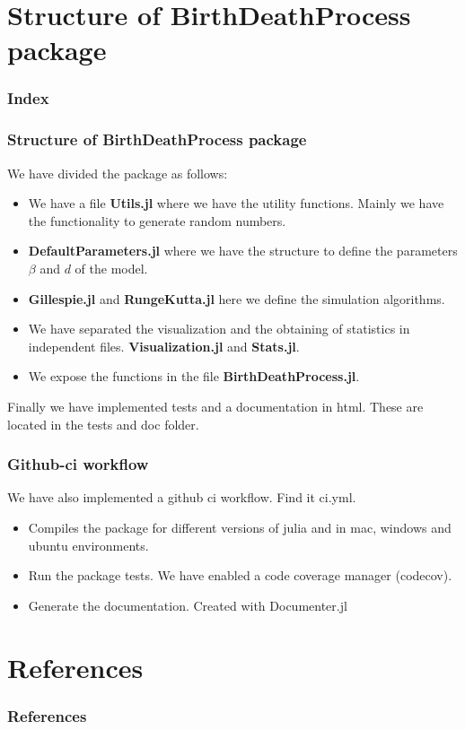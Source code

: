 \documentclass[10pt, usenames, dvipsnames, xcolor=table]{beamer}
\begin{document}
\section{Structure of BirthDeathProcess package}
\begin{frame}
  \frametitle{Index}
  \tableofcontents[currentsection]
\end{frame}
\begin{frame}
\frametitle{Structure of BirthDeathProcess package}
We have divided the package as follows:
\begin{itemize}
\item We have a file \textbf{Utils.jl} where we have the utility functions. Mainly we have the functionality to generate random numbers.
\item \textbf{DefaultParameters.jl} where we have the structure to define the parameters $\beta$ and $d$ of the model.
\item \textbf{Gillespie.jl} and \textbf{RungeKutta.jl} here we define the simulation algorithms.
\item We have separated the visualization and the obtaining of statistics in independent files. \textbf{Visualization.jl} and \textbf{Stats.jl}.
\item We expose the functions in the file \textbf{BirthDeathProcess.jl}.
\end{itemize}
Finally we have implemented tests and a documentation in html. These are located in the tests and doc folder.
\end{frame}

\begin{frame}
\frametitle{Github-ci workflow}
We have also implemented a github ci workflow. Find it ci.yml.
\begin{itemize}
\item Compiles the package for different versions of julia and in mac, windows and ubuntu environments.
\item Run the package tests. We have enabled a code coverage manager (codecov).
\item Generate the documentation. Created with Documenter.jl
\end{itemize}
\end{frame}


\nocite{*} 
\section{References}
\begin{frame}[allowframebreaks]
\frametitle{References}




\end{frame}
\end{document}
